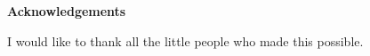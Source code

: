 
\begin{center}\textbf{Acknowledgements}\end{center}

I would like to thank all the little people who made this possible.


\cleardoublepage



